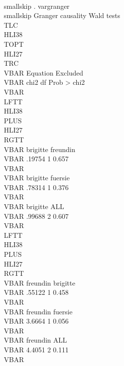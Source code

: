 {\lbr}\\smallskip{\rbr}
. vargranger
{\lbr}\\smallskip{\rbr}
   Granger causality Wald tests
  {\lbr}\\TLC{\rbr}\\HLI{\lbr}38{\rbr}{\lbr}\\TOPT{\rbr}\\HLI{\lbr}27{\rbr}{\lbr}\\TRC{\rbr}
  {\lbr}\\VBAR{\rbr}          Equation           Excluded {\lbr}\\VBAR{\rbr}   chi2     df Prob > chi2 {\lbr}\\VBAR{\rbr}
  {\lbr}\\LFTT{\rbr}\\HLI{\lbr}38{\rbr}{\lbr}\\PLUS{\rbr}\\HLI{\lbr}27{\rbr}{\lbr}\\RGTT{\rbr}
  {\lbr}\\VBAR{\rbr}          brigitte           freundin {\lbr}\\VBAR{\rbr}  .19754     1    0.657    {\lbr}\\VBAR{\rbr}
  {\lbr}\\VBAR{\rbr}          brigitte            fuersie {\lbr}\\VBAR{\rbr}  .78314     1    0.376    {\lbr}\\VBAR{\rbr}
  {\lbr}\\VBAR{\rbr}          brigitte                ALL {\lbr}\\VBAR{\rbr}  .99688     2    0.607    {\lbr}\\VBAR{\rbr}
  {\lbr}\\LFTT{\rbr}\\HLI{\lbr}38{\rbr}{\lbr}\\PLUS{\rbr}\\HLI{\lbr}27{\rbr}{\lbr}\\RGTT{\rbr}
  {\lbr}\\VBAR{\rbr}          freundin           brigitte {\lbr}\\VBAR{\rbr}  .55122     1    0.458    {\lbr}\\VBAR{\rbr}
  {\lbr}\\VBAR{\rbr}          freundin            fuersie {\lbr}\\VBAR{\rbr}  3.6664     1    0.056    {\lbr}\\VBAR{\rbr}
  {\lbr}\\VBAR{\rbr}          freundin                ALL {\lbr}\\VBAR{\rbr}  4.4051     2    0.111    {\lbr}\\VBAR{\rbr}
